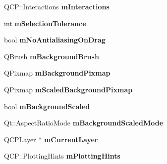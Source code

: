 \begin{DoxyCompactItemize}
\item 
Q\+C\+P\+::\+Interactions {\bfseries m\+Interactions}\hypertarget{classQCustomPlot_ad717377ceba7493b4b32f0bcbbdf1895}{}\label{classQCustomPlot_ad717377ceba7493b4b32f0bcbbdf1895}

\item 
int {\bfseries m\+Selection\+Tolerance}\hypertarget{classQCustomPlot_abc36e12dd0482117ad810a800c847722}{}\label{classQCustomPlot_abc36e12dd0482117ad810a800c847722}

\item 
bool {\bfseries m\+No\+Antialiasing\+On\+Drag}\hypertarget{classQCustomPlot_ac83df968435f6b8ec79f2993ab9124e8}{}\label{classQCustomPlot_ac83df968435f6b8ec79f2993ab9124e8}

\item 
Q\+Brush {\bfseries m\+Background\+Brush}\hypertarget{classQCustomPlot_a3aef5de4ac012178e3293248e9c63737}{}\label{classQCustomPlot_a3aef5de4ac012178e3293248e9c63737}

\item 
Q\+Pixmap {\bfseries m\+Background\+Pixmap}\hypertarget{classQCustomPlot_ae8f4677399324a78c5f8dbfb95a34f90}{}\label{classQCustomPlot_ae8f4677399324a78c5f8dbfb95a34f90}

\item 
Q\+Pixmap {\bfseries m\+Scaled\+Background\+Pixmap}\hypertarget{classQCustomPlot_a081bf046501d52642dc6d7e3bdb97d57}{}\label{classQCustomPlot_a081bf046501d52642dc6d7e3bdb97d57}

\item 
bool {\bfseries m\+Background\+Scaled}\hypertarget{classQCustomPlot_a62fe584b20680b1b2e1c7efb5c5416a5}{}\label{classQCustomPlot_a62fe584b20680b1b2e1c7efb5c5416a5}

\item 
Qt\+::\+Aspect\+Ratio\+Mode {\bfseries m\+Background\+Scaled\+Mode}\hypertarget{classQCustomPlot_ab82e8a5e3ad6b486f95d6da8bf49e9aa}{}\label{classQCustomPlot_ab82e8a5e3ad6b486f95d6da8bf49e9aa}

\item 
\hyperlink{classQCPLayer}{Q\+C\+P\+Layer} $\ast$ {\bfseries m\+Current\+Layer}\hypertarget{classQCustomPlot_aa27569c92e74395af10151357d268628}{}\label{classQCustomPlot_aa27569c92e74395af10151357d268628}

\item 
Q\+C\+P\+::\+Plotting\+Hints {\bfseries m\+Plotting\+Hints}\hypertarget{classQCustomPlot_aa184197a6101a9cc5807469e1d006c9e}{}\label{classQCustomPlot_aa184197a6101a9cc5807469e1d006c9e}


\end{DoxyCompactItemize}
